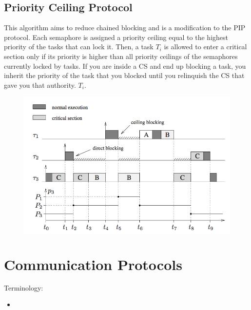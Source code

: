 \documentclass{hw}
\begin{document}
\subsection{Priority Ceiling Protocol}
This algorithm aims to reduce chained blocking and is a modification to the PIP
protocol. Each semaphore is assigned a priority ceiling equal to
the highest priority of the tasks that can lock it. Then, a task $T_{i}$ is 
allowed to enter a critical section only if its priority is higher than all 
priority ceilings of the semaphores currently locked by tasks. If you are inside
a CS and end up blocking a task, you inherit the priority of the task that you 
blocked until you relinquish the CS that gave you that authority.
$T_{i}$.
\begin{figure}[H]
  \centering
  \includegraphics[scale=.7]{pcp}
\end{figure}


\section{Communication Protocols}
Terminology: 
\begin{itemize}
  \item 
\end{itemize}
\end{document}
